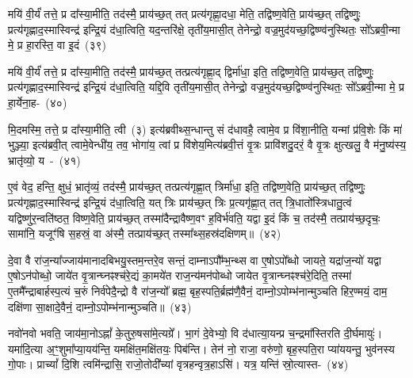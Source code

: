 मयि॑ वी॒र्यं॑ तत्ते॒ प्र दा᳚स्या॒मीति॒ तद॑स्मै॒ प्राय॑च्छ॒त् तत् प्रत्य॑\-गृह्णा॒दधा॒ मेति॒ तद्विष्ण॒वेति॒ प्राय॑च्छ॒त् तद्विष्णुः॒ प्रत्य॑\-गृह्णाद॒स्मास्विन्द्र॑ इन्द्रि॒यं द॑धा॒त्विति॒ यद॒न्तरि॑क्षे॒ तृती॑य॒मासी॒त् तेनेन्द्रो॒ वज्र॒मुद॑यच्छ॒द्विष्ण्व॑नुस्थितः॒ सो᳚\-ऽब्रवी॒न्मा मे॒ प्र हा॒रस्ति॒ वा इ॒दं~(३९)\ip

मयि॑ वी॒र्यं॑ तत्ते॒ प्र दा᳚स्या॒मीति॒ तद॑स्मै॒ प्राय॑च्छ॒त् तत्प्रत्य॑\-गृह्णा॒द् द्विर्मा॑धा॒ इति॒ तद्विष्ण॒वेति॒ प्राय॑च्छ॒त् तद्विष्णुः॒ प्रत्य॑\-गृह्णाद॒स्मास्विन्द्र॑ इन्द्रि॒यं द॑धा॒त्विति॒ यद्दि॒वि तृती॑य॒मासी॒त् तेनेन्द्रो॒ वज्र॒मुद॑यच्छ॒द्विष्ण्व॑नुस्थितः॒ सो᳚\-ऽब्रवी॒न्मा मे॒ प्र हा॒र्येना॒ह-~(४०)\ip

मि॒दमस्मि॒ तत्ते॒ प्र दा᳚स्या॒मीति॒ त्वी~(३) इत्य॑ब्रवीथ्स॒न्धान्तु सं द॑धावहै॒ त्वामे॒व प्र वि॑शा॒नीति॒ यन्मां प्र॑वि॒शेः किं मा॑ भुञ्ज्या॒ इत्य॑ब्रवी॒त् त्वामे॒वेन्धी॑य॒ तव॒ भोगा॑य॒ त्वां प्र वि॑शेय॒मित्य॑ब्रवी॒त्तं वृ॒त्रः प्रावि॑शदु॒दरं॒ वै वृ॒त्रः क्षुत्खलु॒ वै म॑नु॒ष्य॑स्य॒ भ्रातृ॑व्यो॒ य~-~(४१)\ip

ए॒वं वेद॒ हन्ति॒ क्षुधं॒ भ्रातृ॑व्यं॒ तद॑स्मै॒ प्राय॑च्छ॒त् तत्प्रत्य॑\-गृह्णा॒त् त्रिर्मा॑धा॒ इति॒ तद्विष्ण॒वेति॒ प्राय॑च्छ॒त् तद्विष्णुः॒ प्रत्य॑\-गृह्णाद॒स्मास्विन्द्र॑ इन्द्रि॒यं द॑धा॒त्विति॒ यत् त्रिः प्राय॑च्छ॒त् त्रिः प्र॒त्यगृ॑ह्णा॒त् तत् त्रि॒धातो᳚स्त्रिधातु॒त्वं यद्विष्णु॑र॒न्वति॑ष्ठत॒ विष्ण॒वेति॒ प्राय॑च्छ॒त् तस्मा॑दैन्द्रा\-वैष्ण॒वꣳ ह॒विर्भ॑वति॒ यद्वा इ॒दं किं च॒ तद॑स्मै॒ तत्प्राय॑च्छ॒दृचः॒ सामा॑नि॒ यजूꣳ॑षि स॒हस्रं॒ वा अ॑स्मै॒ तत्प्राय॑च्छ॒त् तस्मा᳚थ्स॒हस्र॑द\-क्षिणम्॥~(४२)\ip

{\anuvakamend[{प्र॒व॒णं विष्णु॒र्वा इ॒दमि॒दम॒हं यो भ॑व॒त्येक॑विꣳशतिश्च}]}%

दे॒वा वै रा॑ज॒न्या᳚ज्जाय॑मानादबिभयु॒स्तम॒न्तरे॒व सन्तं॒ दाम्ना\-ऽपौ᳚म्भ॒न्थ्स वा ए॒षो\-ऽपो᳚ब्धो जायते॒ यद्रा॑ज॒न्यो॑ यद्वा ए॒षो\-ऽन॑पोब्धो॒ जाये॑त वृ॒त्रान्घ्नꣴश्च॑रे॒द्यं का॒मये॑त राज॒न्य॑मन॑पोब्धो जायेत वृ॒त्रान्घ्नꣴश्च॑रे॒दिति॒ तस्मा॑ ए॒तमै᳚न्द्राबार्\mbox{}हस्प॒त्यं च॒रुं निर्व॑पेदै॒न्द्रो वै रा॑ज॒न्यो᳚ ब्रह्म॒ बृह॒स्पति॒र्ब्रह्म॑णै॒वैनं॒ दाम्नो॒\-ऽपोम्भ॑नान्मुञ्चति हिर॒ण्मयं॒ दाम॒ दक्षि॑णा सा॒क्षादे॒वैनं॒ दाम्नो॒\-ऽपोम्भ॑नान्मुञ्चति॥~(४३)\ip

{\anuvakamend[{ए॒नं॒ द्वाद॑श च}]}%

नवो॑नवो भवति॒ जाय॑मा॒नो\-ऽह्नां᳚ के॒तुरु॒षसा॑मे॒त्यग्रे᳚। भा॒गं दे॒वे\-भ्यो॒ वि द॑धात्या॒यन्प्र च॒न्द्रमा᳚स्तिरति दी॒र्घमायुः॑। यमा॑दि॒त्या अ॒ꣳ॒शुमा᳚\-प्या॒यय॑न्ति॒ यमक्षि॑त॒मक्षि॑तयः॒ पिब॑न्ति। तेन॑ नो॒ राजा॒ वरु॑णो॒ बृह॒स्पति॒रा प्या॑ययन्तु॒ भुव॑नस्य गो॒पाः। प्राच्यां᳚ दि॒शि त्वमि॑न्द्रासि॒ राजो॒तोदी᳚च्यां वृत्रहन्वृत्र॒हा\-ऽसि॑। यत्र॒ यन्ति॑ स्रो॒त्यास्त-~(४४)\ip

